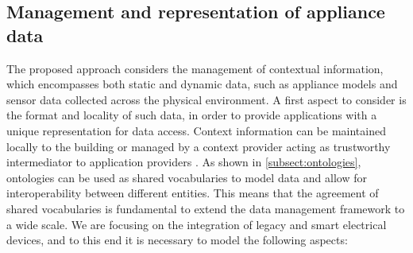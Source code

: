 \documentclass{article}
\begin{document}
\subsection{Management and representation of appliance data}\label{subsec:nilmrepresentation}
The proposed approach considers the management of contextual information, which encompasses both static and dynamic data, such as appliance models and sensor data collected across the physical environment.
A first aspect to consider is the format and locality of such data, in order to provide applications with a unique representation for data access.
Context information can be maintained locally to the building or managed by a context provider acting as trustworthy intermediator to application providers \cite{monacchi:2013}.
As shown in \ref{subsect:ontologies}, ontologies can be used as shared vocabularies to model data and allow for interoperability between different entities.
This means that the agreement of shared vocabularies is fundamental to extend the data management framework to a wide scale.
We are focusing on the integration of legacy and smart electrical devices, and to this end it is necessary to model the following aspects:
\end{document}
